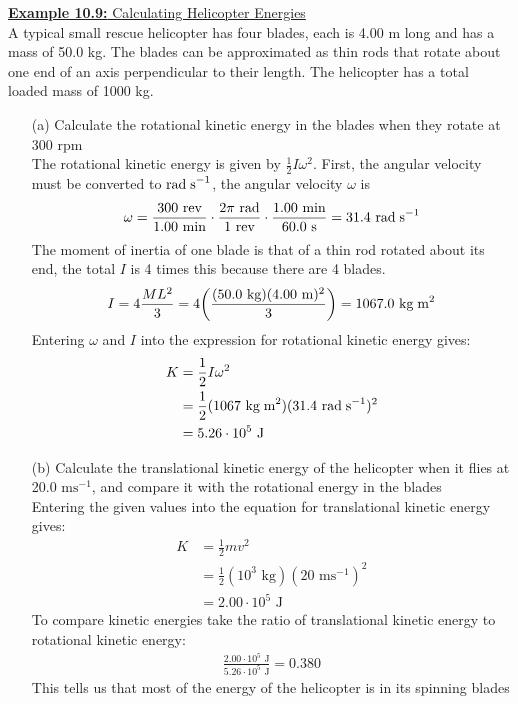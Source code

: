 \documentclass[a4paper]{article}
\let\bf\textbf
\newcommand\rads{\text{ rad\;s}^{-1}}
\newcommand\rad{\text{ rad}}
\newcommand\s{\text{ s}}
\newcommand\m{\text{ m}}
\newcommand\J{\text{ J}}
\newcommand\ms{\text{ ms}^{-1}}
\newcommand\kg{\text{ kg}}
\newcommand\kgmm{\text{ kg\;m}^{2}}
\begin{document}
\begin{shaded}
    \underline{\bf{Example 10.9:} Calculating Helicopter Energies}
    \vspace{2mm}\\
    A typical small rescue helicopter has four blades, each is 4.00 m long and has a mass of 50.0 kg. The blades can be approximated as thin rods that rotate about one end of an axis perpendicular to their length. The helicopter has a total loaded mass of 1000 kg.
    \begin{enumerate}
        \item[(a)] Calculate the rotational kinetic energy in the blades when they rotate at 300 rpm
        \vspace{2mm}\\
        The rotational kinetic energy is given by $\frac{1}{2}I\omega^2$. First, the angular velocity must be converted to$\rads$, the angular velocity $\omega$ is
        \begin{align*}
            \omega = \frac{300\text{ rev}}{1.00\text{ min}} \cdot \frac{2\pi\rad}{1\text{ rev}} \cdot \frac{1.00\text{ min}}{60.0\s} = 31.4\rads
        \end{align*}
        The moment of inertia of one blade is that of a thin rod rotated about its end, the total $I$ is 4 times this because there are 4 blades.
        \begin{align*}
            I = 4\frac{ML^2}{3} = 4\bigg(\frac{(50.0\kg)(4.00\m)^2}{3}\bigg) = 1067.0\kgmm
        \end{align*}
        Entering $\omega$ and $I$ into the expression for rotational kinetic energy gives:
        \begin{align*}
            K &= \frac{1}{2}I\omega^2\\
            &= \frac{1}{2}(1067\kgmm)(31.4\rads)^2\\
            &= 5.26 \cdot 10^5\J
        \end{align*}
        \item[(b)] Calculate the translational kinetic energy of the helicopter when it flies at 20.0$\ms$, and compare it with the rotational energy in the blades
        \vspace{1mm}\\
        Entering the given values into the equation for translational kinetic energy gives:
        \begin{align*}
            K &= \frac{1}{2}mv^2\\
            &= \frac{1}{2}(10^3\kg)(20\ms)^2\\
            &= 2.00 \cdot 10^5\J
        \end{align*}
        To compare kinetic energies take the ratio of translational kinetic energy to rotational kinetic energy:
        \begin{align*}
            \frac{2.00 \cdot 10^5\J}{5.26 \cdot 10^5\J} = 0.380
        \end{align*}
        This tells us that most of the energy of the helicopter is in its spinning blades
    \end{enumerate}
\end{shaded}
\end{document}
